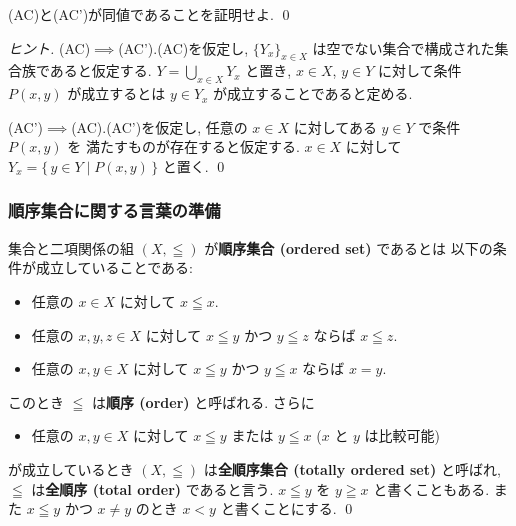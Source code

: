 \documentclass[12pt,twoside]{jarticle}
\begin{document}
\begin{question}[5点]
  (AC)と(AC')が同値であることを証明せよ. \qed
\end{question}

\begin{proof}[ヒント]
  (AC)$\implies$(AC').\enspace (AC)を仮定し, 
  $\{Y_x\}_{x\in X}$ は空でない集合で構成された集合族であると仮定する.
  $Y=\bigcup_{x\in X} Y_x$ と置き, 
  $x\in X$, $y\in Y$ に対して条件 $P(x,y)$ が成立するとは
  $y\in Y_x$ が成立することであると定める.

  (AC')$\implies$(AC).\enspace (AC')を仮定し, 
  任意の $x\in X$ に対してある $y\in Y$ で条件 $P(x,y)$ を
  満たすものが存在すると仮定する.
  $x\in X$ に対して $Y_x=\{\,y\in Y\mid P(x,y)\,\}$ と置く.
  \qed
\end{proof}


\subsubsection{順序集合に関する言葉の準備}

\begin{definition}[順序集合]
  集合と二項関係の組 $(X,\leqq)$ が{\bf 順序集合 (ordered set)} であるとは
  以下の条件が成立していることである:
  \begin{itemize}
  \item 任意の $x\in X$ に対して $x\leqq x$.
  \item 任意の $x,y,z\in X$ に対して $x\leqq y$ かつ $y\leqq z$ 
    ならば $x\leqq z$.
  \item 任意の $x,y\in X$ に対して $x\leqq y$ かつ $y\leqq x$ 
    ならば $x = y$.
  \end{itemize}
  このとき $\leqq$ は{\bf 順序 (order)} と呼ばれる. さらに
  \begin{itemize}
  \item 任意の $x,y\in X$ に対して $x\leqq y$ または $y\leqq x$
    \enspace ($x$ と $y$ は比較可能)
  \end{itemize}
  が成立しているとき $(X,\leqq)$ は{\bf 全順序集合 (totally ordered set)} 
  と呼ばれ, $\leqq$ は{\bf 全順序 (total order)} であると言う.
  $x\leqq y$ を $y\geqq x$ と書くこともある.
  また $x\leqq y$ かつ $x\ne y$ のとき $x<y$ と書くことにする.
  \qed
\end{definition}
\end{document}
